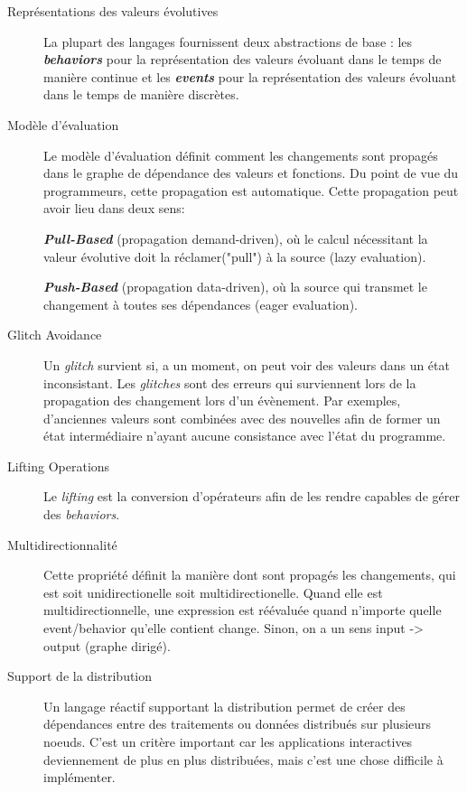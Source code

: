 \documentclass[10pt,final]{IEEEtran}
\begin{document}
\begin{description}
    \item[Représentations des valeurs évolutives]
    La plupart des langages fournissent deux abstractions de base : les \textbf{\textit{behaviors}} pour la représentation des valeurs évoluant dans le temps de manière continue et les \textbf{\textit{events}} pour la représentation des valeurs évoluant dans le temps de manière discrètes.
    
    \item[Modèle d'évaluation]
    Le modèle d'évaluation définit comment les changements sont propagés dans le graphe de dépendance des valeurs et fonctions. Du point de vue du programmeurs, cette propagation est automatique. Cette propagation peut avoir lieu dans deux sens: 
    
    \textbf{\textit{Pull-Based}} (propagation demand-driven), où le calcul nécessitant la valeur évolutive doit la réclamer("pull") à la source (lazy evaluation).
    
    \textbf{\textit{Push-Based}} (propagation data-driven), où la source qui transmet le changement à toutes ses dépendances (eager evaluation).
    
    \item[Glitch Avoidance]
    Un \textit{glitch} survient si, a un moment, on peut voir des valeurs dans un état inconsistant. Les \textit{glitches} sont des erreurs qui surviennent lors de la propagation des changement lors d'un évènement. Par exemples, d'anciennes valeurs sont combinées avec des nouvelles afin de former un état intermédiaire n'ayant aucune consistance avec l'état du programme.
    
    \item[Lifting Operations]
    Le \textit{lifting} est la conversion d'opérateurs afin de les rendre capables de gérer des \textit{behaviors}.
    
    \item[Multidirectionnalité]
    Cette propriété définit la manière dont sont propagés les changements, qui est soit unidirectionelle soit multidirectionelle. Quand elle est multidirectionnelle, une expression est réévaluée quand n'importe quelle event/behavior qu'elle contient change. Sinon, on a un sens input -> output (graphe dirigé).
    
    \item[Support de la distribution]
    Un langage réactif supportant la distribution permet de créer des dépendances entre des traitements ou données distribués sur plusieurs noeuds. C'est un critère important car les applications interactives deviennement de plus en plus distribuées, mais c'est une chose difficile à implémenter.
\end{description}
\end{document}
